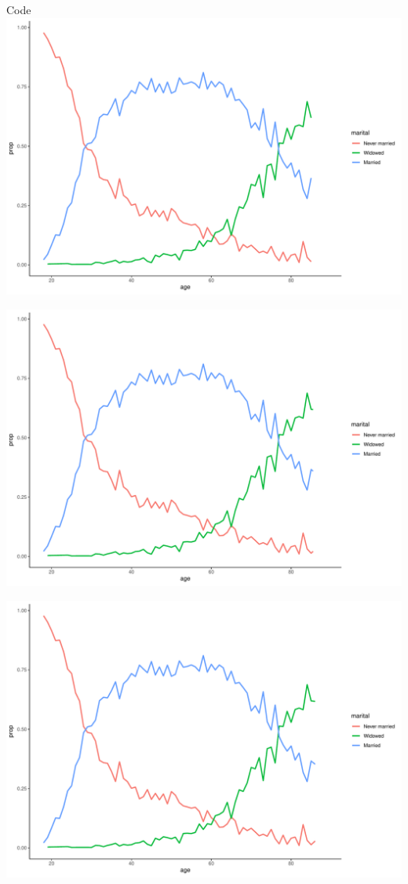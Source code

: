 \documentclass[
  ignorenonframetext,
]{beamer}
\begin{document}
\begin{frame}[fragile]{Code}
\includegraphics{gss_cat_files/figure-beamer/unnamed-chunk-1-98.pdf}

\includegraphics{gss_cat_files/figure-beamer/unnamed-chunk-1-99.pdf}

\includegraphics{gss_cat_files/figure-beamer/unnamed-chunk-1-100.pdf}


\end{frame}
\end{document}

